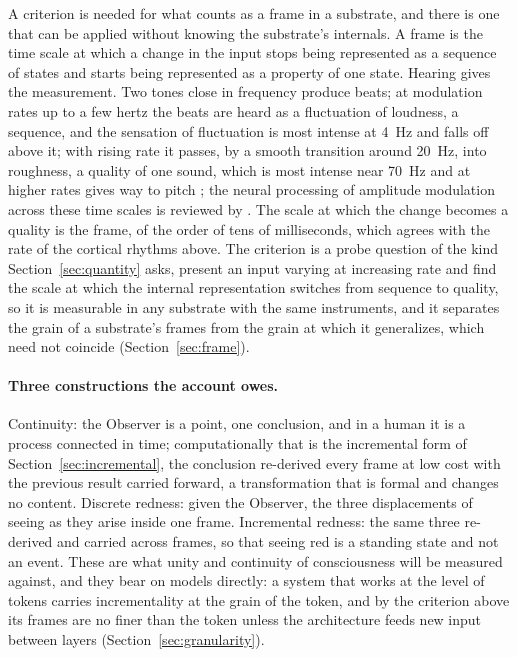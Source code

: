 A criterion is needed for what counts as a frame in a substrate, and there is one that can be applied
without knowing the substrate's internals. A frame is the time scale at which a change in the input
stops being represented as a sequence of states and starts being represented as a property of one
state. Hearing gives the measurement. Two tones close in frequency produce beats; at modulation
rates up to a few hertz the beats are heard as a fluctuation of loudness, a sequence, and the sensation
of fluctuation is most intense at 4~Hz and falls off above it; with rising rate it passes, by a
smooth transition around 20~Hz, into roughness, a quality of one sound, which is most intense near
70~Hz and at higher rates gives way to pitch \citep{zwicker2007,moore1995,plomp1965}; the neural
processing of amplitude modulation across these time scales is reviewed by \citet{joris2004}. The
scale at which the change becomes a quality is the frame, of the order of tens of milliseconds, which
agrees with the rate of the cortical rhythms above. The criterion is a probe question of the kind
Section~\ref{sec:quantity} asks, present an input varying at increasing rate and find the scale at
which the internal representation switches from sequence to quality, so it is measurable in any
substrate with the same instruments, and it separates the grain of a substrate's frames from the grain
at which it generalizes, which need not coincide (Section~\ref{sec:frame}).

\paragraph{Three constructions the account owes.}
\label{sec:constructions}
Continuity: the Observer is a point, one conclusion, and in a human it is a process connected in time;
computationally that is the incremental form of Section~\ref{sec:incremental}, the conclusion
re-derived every frame at low cost with the previous result carried forward, a transformation that is
formal and changes no content. Discrete redness: given the Observer, the three displacements of seeing as they arise
inside one frame. Incremental redness: the same three re-derived and carried across frames, so that
seeing red is a standing state and not an event. These are what unity and continuity of consciousness
will be measured against, and they bear on models directly: a system that works at the level of tokens
carries incrementality at the grain of the token, and by the criterion above its frames are no finer
than the token unless the architecture feeds new input between layers (Section~\ref{sec:granularity}).

